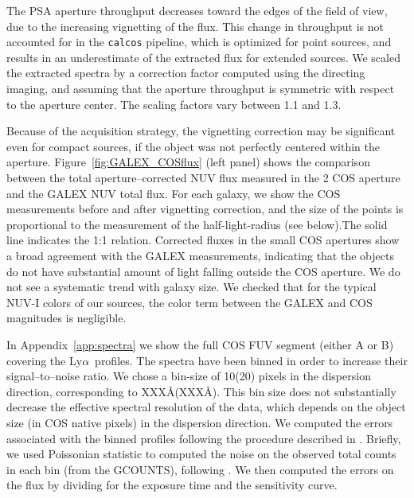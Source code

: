 \documentclass[manuscript]{emulateapj}
\newcommand{\lya}{Ly$\alpha$}
\begin{document}
The PSA aperture throughput decreases toward the edges of the field of
view, due to the increasing vignetting of the flux. This change in
throughput is not accounted for in the {\tt calcos} pipeline, which is
optimized for point sources, and results in an underestimate of the
extracted flux for extended sources. We scaled the extracted spectra
by a correction factor computed using the directing imaging, and
assuming that the aperture throughput is symmetric with respect to the
aperture center. The scaling factors vary between 1.1 and 1.3. 

Because of the acquisition strategy, the vignetting correction may be
significant even for  compact sources, if the object was not perfectly centered 
within the aperture.  Figure~\ref{fig:GALEX_COSflux} (left panel) shows the 
comparison between the total aperture--corrected NUV flux measured in the 
2 COS aperture and the GALEX NUV total flux. For each galaxy, we show the COS
measurements before and after vignetting correction, and the size of
the points is proportional to the measurement of the half-light-radius
(see below).The solid line indicates the 1:1 relation. Corrected fluxes in
the small COS apertures show a  broad agreement with the GALEX
measurements, indicating that the objects do not have substantial amount of 
light falling outside the COS aperture. We do not see a systematic trend 
with  galaxy size. We checked that for the typical NUV-I colors of
  our sources, the color term between the GALEX and COS magnitudes is
  negligible.

In Appendix~\ref{app:spectra} we show the full COS FUV segment (either A or B) covering the \lya\ profiles. 
The spectra have been binned in order to increase their signal--to--noise ratio. We chose a bin-size of 10(20) pixels 
in the dispersion direction, corresponding to XXX\AA(XXX\AA). This bin size does not substantially decrease the effective 
spectral resolution of the data, which depends on the object size (in COS native pixels) in the dispersion direction. 
We computed the errors associated with the binned profiles following the procedure described in \citet{henry2015}.
Briefly,  we used Poissonian statistic to computed the noise on the observed total counts  in each bin (from the GCOUNTS), following \citet{gehrels1986}. We then computed the errors on the flux by dividing for the exposure time and the sensitivity curve.
\end{document}
